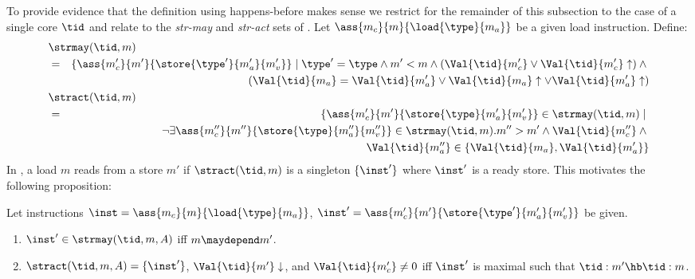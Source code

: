 To provide evidence that the definition using happens-before makes sense we
restrict for the remainder of this subsection to the case of a single core $\tid$ and relate
to the \emph{str-may} and \emph{str-act} sets of \cite{inspectre,MIL}. Let
$\ass{m_c}{m}{\load{\type}{m_a}}$ be a given load instruction. Define:
%
\begin{eqnarray*}
\lefteqn{\strmay(\tid,m)} \\
 & = & \{\ass{m_c'}{m'}{\store{\type'}{m_a'}{m_v'}}\mid
\type'=\type\wedge m' < m \wedge (\Val{\tid}{m_c'} \vee \Val{\tid}{m_c'}\uparrow) \wedge \mbox{} \\
 &   & (\Val{\tid}{m_a}=\Val{\tid}{m_a'} \vee \Val{\tid}{m_a}\uparrow \vee
\Val{\tid}{m_a'}\uparrow) \\
\lefteqn{\stract(\tid,m)} \\
 & = & \{\ass{m_c'}{m'}{\store{\type}{m_a'}{m_v'}} \in \strmay(\tid,m)\mid\mbox{} \\
 &   & \neg\exists\ass{m_c''}{m''}{\store{\type}{m_a''}{m_v''}}\in\strmay(\tid,m).m''>m'\wedge \Val{\tid}{m_c''}\wedge \mbox{} \\
 &   & \Val{\tid}{m_a''} \in\{\Val{\tid}{m_a},\Val{\tid}{m_a'}\}
\end{eqnarray*}
%
In \cite{inspectre,MIL}, a load $m$ reads from a store $m'$ if
$\stract(\tid,m)$ is a singleton $\{\inst'\}$ where
$\inst'$ is a ready store. This motivates the following proposition:
%
\begin{proposition}
Let instructions $\inst=\ass{m_c}{m}{\load{\type}{m_a}}$,
$\inst' = \ass{m_c'}{m'}{\store{\type'}{m_a'}{m_v'}}$ be given.
\begin{enumerate}
\item $\inst'\in \strmay(\tid,m,A)$ iff
$m\maydepend m'$.
\item $\stract(\tid,m,A)=\{\inst'\}$, $\Val{\tid}{m'}\downarrow$, and $\Val{\tid}{m_c'}\neq 0$ iff $\inst'$ is maximal such that $\tid:m'\hb \tid:m$.
\end{enumerate}
\end{proposition}
